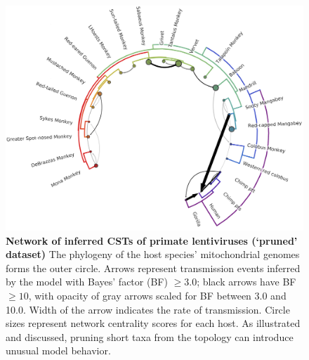 \begin{figure}[ht!]
  \begin{centering}
    \includegraphics[width=.8\linewidth]{./png/siv_pruneddata_cst.png}
  	\caption[Network of inferred CSTs of primate lentiviruses (`pruned' dataset)]{\textbf{Network of inferred CSTs of primate lentiviruses (`pruned' dataset) }
    The phylogeny of the host species' mitochondrial genomes forms the outer circle.
    Arrows represent transmission events inferred by the model with Bayes' factor (BF) $\geq 3.0$; black arrows have BF $\geq 10$, with opacity of gray arrows scaled for BF between 3.0 and 10.0.
    Width of the arrow indicates the rate of transmission.
    Circle sizes represent network centrality scores for each host.
    As illustrated and discussed, pruning short taxa from the topology can introduce unusual model behavior.
}
  	\label{siv_pruneddata_cst}
  \end{centering}
\end{figure}

